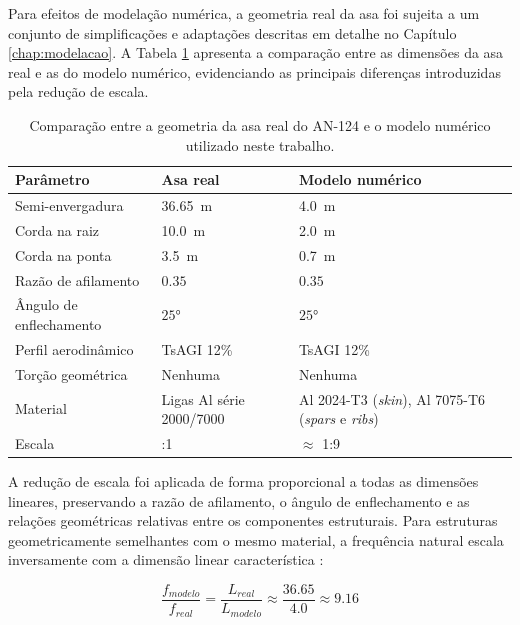 \documentclass[11pt,oneside,a4paper,final]{report}
\begin{document}
Para efeitos de modelação numérica, a geometria real da asa foi sujeita a um conjunto de simplificações e adaptações descritas em detalhe no Capítulo \ref{chap:modelacao}. A Tabela \ref{tab:modelo_vs_real} apresenta a comparação entre as dimensões da asa real e as do modelo numérico, evidenciando as principais diferenças introduzidas pela redução de escala.

\begin{table}[H]
\centering
\caption{Comparação entre a geometria da asa real do AN-124 e o modelo numérico utilizado neste trabalho.}
\label{tab:modelo_vs_real}
\renewcommand{\arraystretch}{1.4}
\begin{tabularx}{\textwidth}{l >{\hsize=0.8\hsize\raggedright\arraybackslash}X >{\hsize=1.2\hsize\raggedright\arraybackslash}X}
\toprule
\textbf{Parâmetro} & \textbf{Asa real} & \textbf{Modelo numérico} \\
\midrule
Semi-envergadura & \SI{36.65}{\meter} & \SI{4.0}{\meter} \\
Corda na raiz & \SI{10.0}{\meter} & \SI{2.0}{\meter} \\
Corda na ponta & \SI{3.5}{\meter} & \SI{0.7}{\meter} \\
Razão de afilamento & $0.35$ & $0.35$ \\
Ângulo de enflechamento & $\ang{25}$ & $\ang{25}$ \\
Perfil aerodinâmico & TsAGI 12\% & TsAGI 12\% \\
Torção geométrica & Nenhuma & Nenhuma \\
Material & Ligas Al série 2000/7000 & Al 2024-T3 (\textit{skin}), Al 7075-T6 (\textit{spars} e \textit{ribs}) \\
Escala & 1:1 & $\approx$ 1:9 \\
\bottomrule
\end{tabularx}
\end{table}

A redução de escala foi aplicada de forma proporcional a todas as dimensões lineares, preservando a razão de afilamento, o ângulo de enflechamento e as relações geométricas relativas entre os componentes estruturais. Para estruturas geometricamente semelhantes com o mesmo material, a frequência natural escala inversamente com a dimensão linear característica \cite{Craig2006}:

\begin{equation}
    \frac{f_{modelo}}{f_{real}} = 
    \frac{L_{real}}{L_{modelo}} \approx 
    \frac{36.65}{4.0} \approx 9.16
    \label{eq:escala_freq}
\end{equation}
\end{document}
